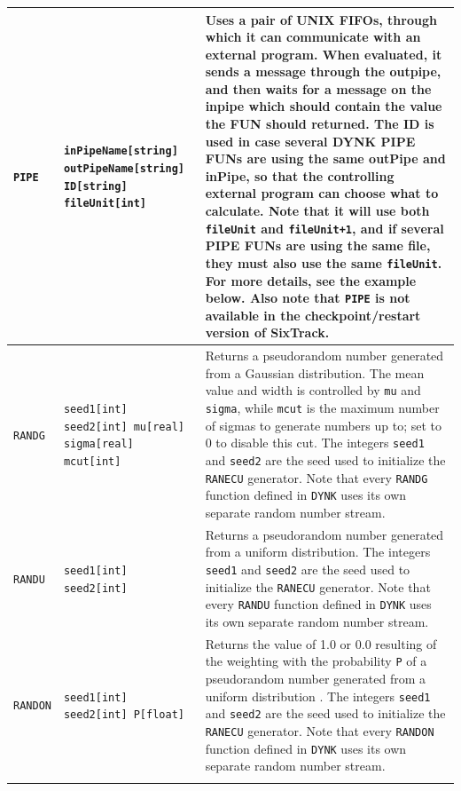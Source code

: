 \begin{center}
\begin{longtable}{|p{1.8cm} | p{4.1cm} | p{9.5cm}|}
    \texttt{PIPE} & \texttt{inPipeName[string] outPipeName[string] ID[string] fileUnit[int]} &
    Uses a pair of UNIX FIFOs, through which it can communicate with an external program.
    When evaluated, it sends a message through the outpipe, and then waits for a message on the inpipe which should contain the value the FUN should returned.
    The ID is used in case several DYNK PIPE FUNs are using the same outPipe and inPipe, so that the controlling external program can choose what to calculate.
    Note that it will use both \texttt{fileUnit} and \texttt{fileUnit+1}, and if several PIPE FUNs are using the same file, they must also use the same \texttt{fileUnit}.
    For more details, see the example below.
    Also note that \texttt{PIPE} is not available in the checkpoint/restart version of SixTrack.\\*
    \hline
    
    \texttt{RANDG} & \texttt{seed1[int] seed2[int] mu[real] sigma[real] mcut[int]} &
    Returns a pseudorandom number generated from a Gaussian distribution.
    The mean value and width is controlled by \texttt{mu} and \texttt{sigma}, while \texttt{mcut} is the maximum number of sigmas to generate numbers up to; set to 0 to disable this cut.
    The integers \texttt{seed1} and \texttt{seed2} are the seed used to initialize the \texttt{RANECU} generator.
    Note that every \texttt{RANDG} function defined in \texttt{DYNK} uses its own separate random number stream.\\*
    \hline

    \texttt{RANDU} & \texttt{seed1[int] seed2[int]} &
    Returns a pseudorandom number generated from a uniform distribution.
    The integers \texttt{seed1} and \texttt{seed2} are the seed used to initialize the \texttt{RANECU} generator.
    Note that every \texttt{RANDU} function defined in \texttt{DYNK} uses its own separate random number stream.\\*
    \hline
    
    \texttt{RANDON} & \texttt{seed1[int] seed2[int] P[float]} &
    Returns the value of 1.0 or 0.0 resulting of the weighting with the probability \texttt{P} of a pseudorandom number generated from a uniform distribution .
    The integers \texttt{seed1} and \texttt{seed2} are the seed used to initialize the \texttt{RANECU} generator.
    Note that every \texttt{RANDON} function defined in \texttt{DYNK} uses its own separate random number stream.\\
    \hline
    
    \rowcolor{blue!15}
    \multicolumn{3}{|l|}{Filters} \\*
    \hline
    

\end{longtable}
\end{center}
